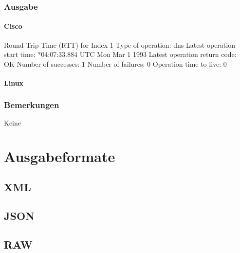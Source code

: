 \documentclass[a4,12pt]{scrartcl}
\begin{document}
\subsubsection{Ausgabe}
\paragraph{Cisco}
Round Trip Time (RTT) for       Index 1
Type of operation: dns
Latest operation start time: *04:07:33.884 UTC Mon Mar 1 1993
Latest operation return code: OK
Number of successes: 1
Number of failures: 0
Operation time to live: 0
\paragraph{Linux}
\subsubsection{Bemerkungen}
Keine




\newpage
\section{Ausgabeformate}
\subsection{XML}
\subsection{JSON}
\subsection{RAW}
\end{document}
